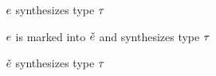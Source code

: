 \documentclass[formalism.tex]{subfiles}
\begin{document}
\judgbox{\ctxSynTypeU{\ctx}{\EMV}{\TMV}} $\EMV$ synthesizes type $\TMV$
%
\begin{mathpar}
\end{mathpar}

\judgbox{\ctxSynFixedInto{\ctx}{\EMV}{\ECMV}{\TMV}} $\EMV$ is marked into $\ECMV$ and synthesizes type $\TMV$
%
\begin{mathpar}
\end{mathpar}

\judgbox{\ctxSynTypeM{\ctx}{\ECMV}{\TMV}} $\ECMV$ synthesizes type $\TMV$
%
\begin{mathpar}
\end{mathpar}
\end{document}
